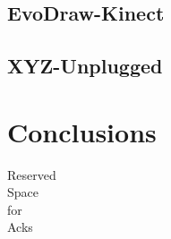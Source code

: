 \subsection{EvoDraw-Kinect}
\subsection{XYZ-Unplugged}


\section{Conclusions}
\label{sec:conclusions}

\begin{acks}

  Reserved\\
  Space\\
  for\\
  Acks

\end{acks}
